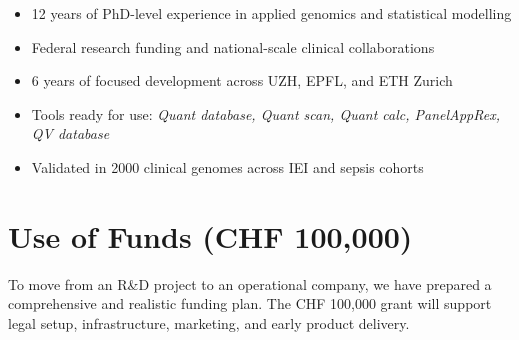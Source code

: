 \documentclass[preprint,12pt,fleqn]{article}
\begin{document}
\begin{itemize}
  \item 12 years of PhD-level experience in applied genomics and statistical modelling
  \item Federal research funding and national-scale clinical collaborations
  \item 6 years of focused development across UZH, EPFL, and ETH Zurich
  \item Tools ready for use: \textit{Quant database, Quant scan, Quant calc, PanelAppRex, QV database}
  \item Validated in 2000 clinical genomes across IEI and sepsis cohorts
\end{itemize}


\section{Use of Funds (CHF 100,000)}

To move from an R\&D project to an operational company, we have prepared a comprehensive and realistic funding plan. The CHF 100,000 grant will support legal setup, infrastructure, marketing, and early product delivery.
\end{document}
